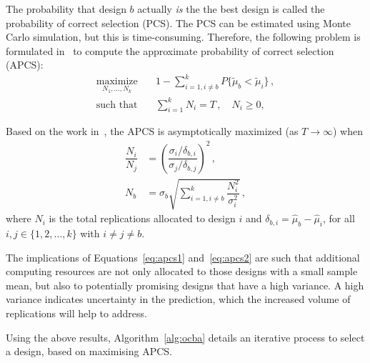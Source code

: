 The probability that design $b$ actually \emph{is} the the best design is called the probability of correct selection (PCS).
The PCS can be estimated using Monte Carlo simulation, but this is time-consuming. Therefore, the following problem is formulated in~\cite{chen2011stochastic} to compute the approximate probability of correct selection (APCS):
\begin{align}
\underset{N_1,\dots,N_k}{\text{maximize}}&\quad 1 - \displaystyle\sum^k_{i=1,i\neq b}P\{\tilde\mu_b < \tilde\mu_i\}\,,\nonumber\\
\text{such that}& \quad \displaystyle\sum^k_{i=1}N_i = T\,, \quad N_i \geq 0,
\end{align}

Based on the work in~\cite{chen2011stochastic}, the APCS is asymptotically maximized (as $T \to \infty$) when
\begin{align}
\dfrac{N_i}{N_j} &= \left(\dfrac{\sigma_i/\delta_{b,i}}{\sigma_j/\delta_{b,j}}\right)^2\,,\label{eq:apcs1}\\[0.2cm]
N_b &= \sigma_b \sqrt{\displaystyle\sum^k_{i=1,i\neq b}\dfrac{N_i^2}{\sigma_i^2}}\,,\label{eq:apcs2}
\end{align}
where $N_i$ is the total replications allocated to design $i$ and $\delta_{b,i} = \hat{\mu}_b - \hat{\mu}_i$, for all $i,j\in \{1,2,\dots,k\}$ with $i \neq j \neq b$.

The implications of Equations~\ref{eq:apcs1} and~\ref{eq:apcs2} are such that additional computing resources are not only allocated to those designs with a small sample mean, but also to potentially promising designs that have a high variance. A high variance indicates uncertainty in the prediction, which the increased volume of replications will help to address.

Using the above results, Algorithm~\ref{alg:ocba} details an iterative process to select a design, based on maximising APCS.

